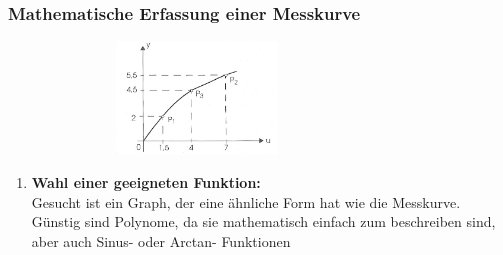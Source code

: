 	\subsubsection{Mathematische Erfassung einer Messkurve }
	\begin{floatingfigure}[r]{12cm}
    \includegraphics[width=10cm,height=3cm]{./bilder/KennlinieMitStuetzwerten.jpg}
	\end{floatingfigure}
   	
     	\begin{enumerate}
     	\item \textbf{Wahl einer geeigneten Funktion:}\\
     	Gesucht ist ein Graph, der eine ähnliche Form
		hat wie die Messkurve. Günstig sind Polynome, da sie mathematisch einfach zum
		beschreiben sind, aber auch Sinus- oder Arctan- Funktionen	\\ 
     	

\end{enumerate}
